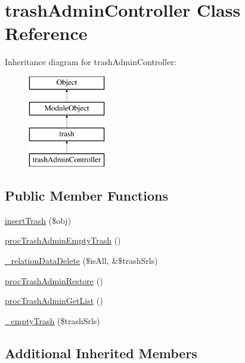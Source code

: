 \hypertarget{classtrashAdminController}{\section{trash\+Admin\+Controller Class Reference}
\label{classtrashAdminController}
}
Inheritance diagram for trash\+Admin\+Controller\+:\begin{figure}[H]
\begin{center}
\leavevmode
\includegraphics[height=4.000000cm]{classtrashAdminController}
\end{center}
\end{figure}
\subsection*{Public Member Functions}
\begin{DoxyCompactItemize}
\item 
\hyperlink{classtrashAdminController_af1c07b97582130b96d72fa6d397d7740}{insert\+Trash} (\$obj)
\item 
\hyperlink{classtrashAdminController_a15977bd5e3c92b5b7b9218dee97a9ed0}{proc\+Trash\+Admin\+Empty\+Trash} ()
\item 
\hyperlink{classtrashAdminController_a6f402d0113009b914de8665786d95ae9}{\+\_\+relation\+Data\+Delete} (\$is\+All, \&\$trash\+Srls)
\item 
\hyperlink{classtrashAdminController_a5bd5aea6170e91d725b7f758480aba38}{proc\+Trash\+Admin\+Restore} ()
\item 
\hyperlink{classtrashAdminController_af522d8b4cd292cce44ea6b1cedfcf0c1}{proc\+Trash\+Admin\+Get\+List} ()
\item 
\hyperlink{classtrashAdminController_adaff8ae03021995e529e1c8f6510ff24}{\+\_\+empty\+Trash} (\$trash\+Srls)
\end{DoxyCompactItemize}
\subsection*{Additional Inherited Members}


